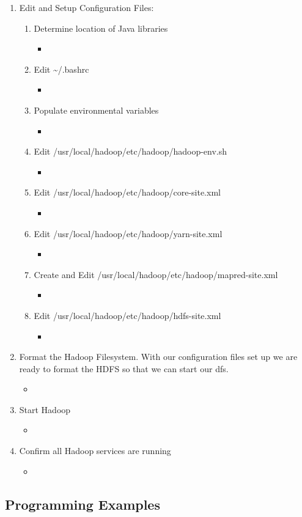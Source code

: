 \documentclass[twoside]{article}
\newcommand{\insertcode}[2]{\begin{itemize}\item[]\end{itemize}} %
\begin{document}
\begin{enumerate}
\begin{enumerate}
		\item Edit and Setup Configuration Files:
			\begin{enumerate}
				\item Determine location of Java libraries
				\insertcode{"scripts/do_get_java_dir"}{Server Output from Editing Determining Java Library Directory}
				\item Edit \textasciitilde/.bashrc
				\insertcode{"scripts/do_edit_bashrc"}{Server Output from Editing .bashrc}
				\item Populate environmental variables
				\insertcode{"scripts/do_source_bashrc"}{Server Output from Sourcing New Env. Variables}
				\item Edit  /usr/local/hadoop/etc/hadoop/hadoop-env.sh
				\insertcode{"scripts/do_edit_hadoop_env"}{Server Output from Editing hadoop\_env.sh}
				\item Edit /usr/local/hadoop/etc/hadoop/core-site.xml
				\insertcode{"scripts/do_edit_core-site"}{Server Output from Editing core-site.xml}
				\item Edit /usr/local/hadoop/etc/hadoop/yarn-site.xml
				\insertcode{"scripts/do_edit_yarn-site"}{Server Output from Editing yarn-site.xml}
				\item Create and Edit /usr/local/hadoop/etc/hadoop/mapred-site.xml
				\insertcode{"scripts/do_edit_mapred-site"}{Server Output from Editing mapred-site.xml}
				\item Edit /usr/local/hadoop/etc/hadoop/hdfs-site.xml
				\insertcode{"scripts/do_edit_hdfs-site"}{Server Output from Editing hdfs-site.xml}
			\end{enumerate}
		\item Format the Hadoop Filesystem. With our configuration files set up we are ready to format the HDFS so that we can start our dfs. 
		\insertcode{"scripts/do_format_hdfs"}{Server Output from Formatting HDFS}
		\item Start Hadoop
		\insertcode{"scripts/do_start_hadoop"}{Server Output from Starting Hadoopl}
		\item Confirm all Hadoop services are running
		\insertcode{"scripts/do_confirm_install"}{Server Output from Confirming Hadoop Install}
	\end{enumerate}
\end{enumerate}

\subsection{Programming Examples}
\end{document}
